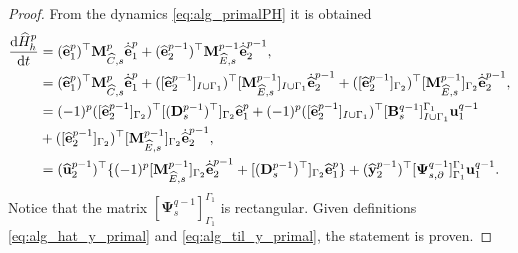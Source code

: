 \documentclass{elsarticle}
\newcommand*{\dual}[1]{\ensuremath{\widehat{#1}}}
\begin{document}
{\begin{proof}
From the dynamics \eqref{eq:alg_primalPH} it is obtained
\begin{equation*}
\begin{aligned}
    \diff{\dual{H}_h^p}{t} &= (\dual{\mathbf{e}}^p_1)^\top \mathbf{M}^p_{\dual{C}, s} \dot{\dual{\mathbf{e}}}^p_1 + (\dual{\mathbf{e}}^{p-1}_2)^\top \mathbf{M}^{p-1}_{\dual{E}, s} \dot{\dual{\mathbf{e}}}^{p-1}_2, \\
    &= (\dual{\mathbf{e}}^p_1)^\top \mathbf{M}^p_{\dual{C}, s} \dot{\dual{\mathbf{e}}}^p_1 + ([\dual{\mathbf{e}}^{p-1}_2]_{I\cup \Gamma_1})^\top [\mathbf{M}^{p-1}_{\dual{E}, s}]_{I\cup \Gamma_1} \dot{\dual{\mathbf{e}}}^{p-1}_2 + ([\dual{\mathbf{e}}^{p-1}_2]_{\Gamma_2})^\top [\mathbf{M}^{p-1}_{\dual{E}, s}]_{\Gamma_2} \dot{\dual{\mathbf{e}}}^{p-1}_2 , \\
    &= (-1)^p ([\dual{\mathbf{e}}^{p-1}_2]_{\Gamma_2})^\top [(\mathbf{D}_{s}^{p-1})^\top]_{\Gamma_2} \dual{\mathbf{e}}^p_1  + (-1)^{p}([\dual{\mathbf{e}}^{p-1}_2]_{I\cup \Gamma_1})^\top[\mathbf{B}^{q-1}_{s}]_{I \cup \Gamma_1}^{\Gamma_1} \mathbf{u}^{q-1}_1 \\
    &+ ([\dual{\mathbf{e}}^{p-1}_2]_{\Gamma_2})^\top [\mathbf{M}^{p-1}_{\dual{E}, s}]_{\Gamma_2} \dot{\dual{\mathbf{e}}}^{p-1}_2, \\
    &= (\dual{\mathbf{u}}^{p-1}_2)^\top \{(-1)^p[\mathbf{M}^{p-1}_{\dual{E}, s}]_{\Gamma_2} \dot{\dual{\mathbf{e}}}^{p-1}_2 +[(\mathbf{D}_{s}^{p-1})^\top]_{\Gamma_2} \dual{\mathbf{e}}^p_1\} + (\dual{\mathbf{y}}^{p-1}_2)^\top[\mathbf{\Psi}^{q-1}_{s, \partial}]_{\Gamma_1}^{\Gamma_1} \mathbf{u}^{q-1}_1.
\end{aligned}
\end{equation*}
Notice that the matrix $[\mathbf{\Psi}^{q-1}_{s}]_{\Gamma_1}^{\Gamma_1}$ is rectangular. Given definitions  \eqref{eq:alg_hat_y_primal} and \eqref{eq:alg_til_y_primal}, the statement is proven. 
\end{proof}

}
\end{document}
